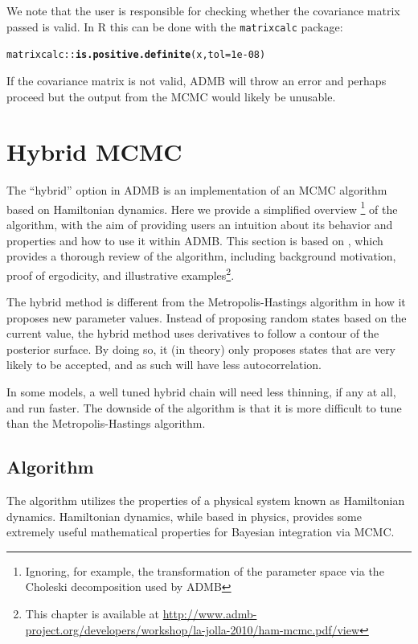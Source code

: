 \documentclass{article}\usepackage[]{graphicx}\usepackage[]{color}
\makeatletter
\newcommand{\hlnum}[1]{\textcolor[rgb]{0.686,0.059,0.569}{#1}}%
\newcommand{\hlstd}[1]{\textcolor[rgb]{0.345,0.345,0.345}{#1}}%
\newcommand{\hlkwc}[1]{\textcolor[rgb]{0.333,0.667,0.333}{#1}}%
\newcommand{\hlkwd}[1]{\textcolor[rgb]{0.737,0.353,0.396}{\textbf{#1}}}%
\newenvironment{kframe}{%
 \def\at@end@of@kframe{}%
 \ifinner\ifhmode%
  \def\at@end@of@kframe{\end{minipage}}%
  \begin{minipage}{\columnwidth}%
 \fi\fi%
 \def\FrameCommand##1{\hskip\@totalleftmargin \hskip-\fboxsep
 \colorbox{shadecolor}{##1}\hskip-\fboxsep
     \hskip-\linewidth \hskip-\@totalleftmargin \hskip\columnwidth}%
 \MakeFramed {\advance\hsize-\width
   \@totalleftmargin\z@ \linewidth\hsize
   \@setminipage}}%
 {\par\unskip\endMakeFramed%
 \at@end@of@kframe}
\newenvironment{knitrout}{}{} %
\makeatother
\begin{document}
We note that the user is responsible for checking whether
the covariance matrix passed is valid. In R this can be done
with the \texttt{matrixcalc} package:
\begin{knitrout}
\color{fgcolor}\begin{kframe}
\begin{alltt}
\hlstd{matrixcalc::}\hlkwd{is.positive.definite}\hlstd{(x,} \hlkwc{tol} \hlstd{=} \hlnum{1e-08}\hlstd{)}
\end{alltt}
\end{kframe}
\end{knitrout}

If the covariance matrix is not valid, ADMB will throw an error and
perhaps proceed but the output from the MCMC would likely be unusable.
\section{Hybrid MCMC}\label{sec:hybrid}
The ``hybrid'' option in ADMB is an implementation of an MCMC algorithm
based on Hamiltonian dynamics. Here we provide a simplified overview
\footnote{Ignoring, for example, the transformation of the parameter space
  via the Choleski decomposition used by ADMB} of the algorithm, with the
aim of providing users an intuition about its behavior and properties and
how to use it within ADMB. This section is based on \cite{brooks2011},
which provides a thorough review of the algorithm, including background
motivation, proof of ergodicity, and illustrative examples\footnote{This
  chapter is available at
  \url{http://www.admb-project.org/developers/workshop/la-jolla-2010/ham-mcmc.pdf/view}}.

The hybrid method is different from the Metropolis-Hastings algorithm in how
it proposes new parameter values. Instead of proposing
random states based on the current value, the hybrid method
uses derivatives to follow a contour of the posterior
surface. By doing so, it (in theory) only proposes states
that are very likely to be accepted, and as such will have
less autocorrelation.

In some models, a well tuned hybrid chain will need less
thinning, if any at all, and run faster. The downside of the
algorithm is that it is more difficult to tune than the Metropolis-Hastings
algorithm.

\subsection{Algorithm}
The algorithm utilizes the properties of a physical system
known as Hamiltonian dynamics. Hamiltonian dynamics, while
based in physics, provides some extremely useful
mathematical properties for Bayesian integration via MCMC.
\end{document}

